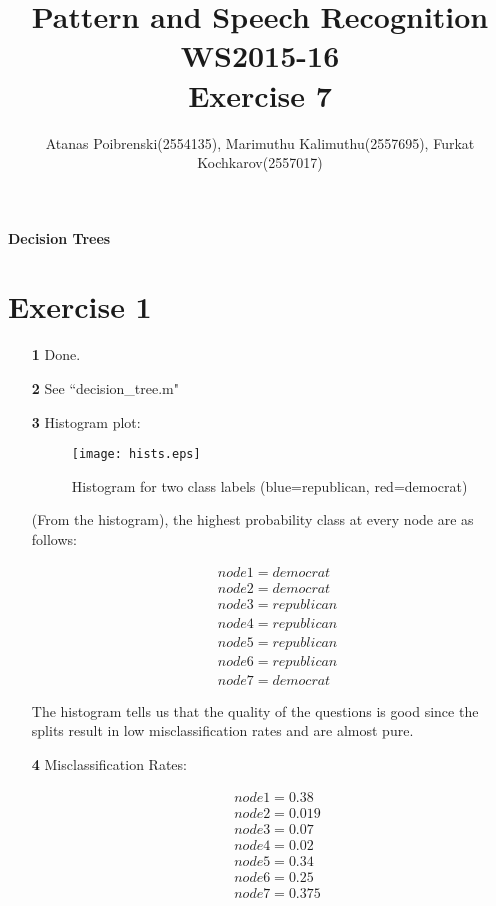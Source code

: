 \documentclass[a4paper]{article}
\title{Pattern and Speech Recognition WS2015-16 \\ Exercise 7}
\author{Atanas Poibrenski(2554135), Marimuthu Kalimuthu(2557695), Furkat Kochkarov(2557017)}
\begin{document}

\maketitle 
\begin{center}
	\textbf{Decision Trees}
\end{center}

\section*{Exercise 1}
\begin{enumerate}
	\item[ \textbf{1} ] Done.
	\item[ \textbf{2} ] See ``decision\_tree.m"
	\item[ \textbf{3} ] Histogram plot:
	\begin{figure}[H]
		\begin{center}
			\texttt{[image: hists.eps]}
			\caption{Histogram for two class labels (blue=republican, red=democrat) }\label{fig:hist_1.3}
		\end{center}
	\end{figure}
	
	(From the histogram), the highest probability class at every node are as follows:
	
	\begin{tcolorbox}
	\begin{align*}
		& node1 = democrat  \\
		& node2 = democrat   \\
		& node3 = republican  \\
		& node4 = republican  \\
		& node5 = republican \\
		& node6 = republican \\
		& node7 = democrat		
	\end{align*}
	\end{tcolorbox}
			
	The histogram tells us that the quality of the questions is good since the splits result in low misclassification rates and are almost pure.
	
	\item[ \textbf{4} ] Misclassification Rates:
	    \begin{tcolorbox}
		\begin{align*}
			& node1 = 0.38 \\
			& node2 = 0.019 \\
			& node3 = 0.07  \\
			& node4 = 0.02  \\
			& node5 = 0.34  \\
			& node6 = 0.25  \\
			& node7 = 0.375
		\end{align*}
    \end{tcolorbox}
    

\end{enumerate}
\end{document}

